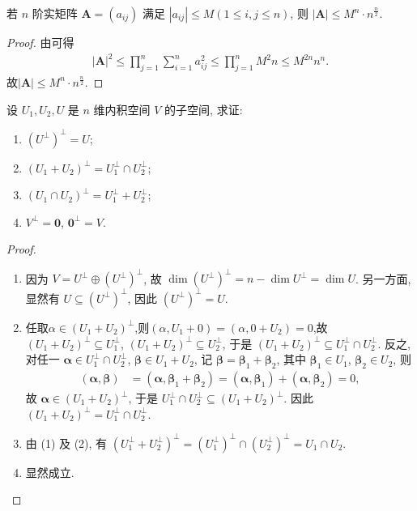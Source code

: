 \documentclass[../../main.tex]{subfiles}
\begin{document}
\begin{corollary}\label{corollary:矩阵的Hadamard不等式的推论}
若 $n$ 阶实矩阵 $\boldsymbol{A} = (a_{ij})$ 满足 $|a_{ij}| \leqslant  M (1 \leqslant  i, j \leqslant  n)$, 则 $|\boldsymbol{A}| \leqslant  M^n \cdot n^{\frac{n}{2}}$. 
\end{corollary}
\begin{proof}
由可得
\begin{align*}
|\boldsymbol{A}|^2\leqslant   \prod_{j = 1}^{n} \sum_{i = 1}^{n} a_{ij}^2 \leqslant  \prod_{j = 1}^{n}M^2n \leqslant   M^{2n}n^n.
\end{align*}
故$|\boldsymbol{A}| \leqslant  M^n \cdot n^{\frac{n}{2}}$. 

\end{proof}

\begin{proposition}\label{proposition:例9.18}
设 $U_1,U_2,U$ 是 $n$ 维内积空间 $V$ 的子空间, 求证:
\begin{enumerate}[(1)]
\item $(U^\perp)^\perp = U$;
\item $(U_1 + U_2)^\perp = U_1^\perp \cap U_2^\perp$;
\item $(U_1 \cap U_2)^\perp = U_1^\perp + U_2^\perp$;
\item $V^\perp = \boldsymbol{0}$, $\boldsymbol{0}^\perp = V$.
\end{enumerate}
\end{proposition}
\begin{proof}
\begin{enumerate}[(1)]
\item 因为 $V = U^\perp \oplus (U^\perp)^\perp$, 故 $\dim (U^\perp)^\perp = n - \dim U^\perp = \dim U$. 另一方面, 显然有 $U \subseteq (U^\perp)^\perp$, 因此 $(U^\perp)^\perp = U$.
\item 任取$\alpha\in (U_1+U_2)^\perp$,则$(\alpha,U_1+0)=(\alpha,0+U_2)=0 $,故$(U_1 + U_2)^\perp \subseteq U_1^\perp$, $(U_1 + U_2)^\perp \subseteq U_2^\perp$, 于是 $(U_1 + U_2)^\perp \subseteq U_1^\perp \cap U_2^\perp$. 反之, 对任一 $\boldsymbol{\alpha} \in U_1^\perp \cap U_2^\perp$, $\boldsymbol{\beta} \in U_1 + U_2$, 记 $\boldsymbol{\beta} = \boldsymbol{\beta}_1 + \boldsymbol{\beta}_2$, 其中 $\boldsymbol{\beta}_1 \in U_1$, $\boldsymbol{\beta}_2 \in U_2$, 则
\begin{align*}
(\boldsymbol{\alpha},\boldsymbol{\beta}) &= (\boldsymbol{\alpha},\boldsymbol{\beta}_1 + \boldsymbol{\beta}_2) = (\boldsymbol{\alpha},\boldsymbol{\beta}_1) + (\boldsymbol{\alpha},\boldsymbol{\beta}_2) = 0,
\end{align*}
故 $\boldsymbol{\alpha} \in (U_1 + U_2)^\perp$, 于是 $U_1^\perp \cap U_2^\perp \subseteq (U_1 + U_2)^\perp$. 因此 $(U_1 + U_2)^\perp = U_1^\perp \cap U_2^\perp$.
\item 由 (1) 及 (2), 有 $(U_1^\perp + U_2^\perp)^\perp = (U_1^\perp)^\perp \cap (U_2^\perp)^\perp = U_1 \cap U_2$.
\item 显然成立. 
\end{enumerate} 

\end{proof}
\end{document}
